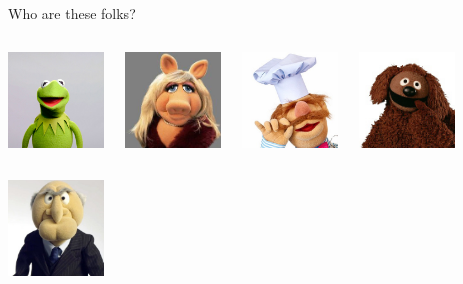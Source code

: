 \documentclass{beamer}\usepackage[]{graphicx}\usepackage[]{color}
\begin{document}
\begin{darkframes}
\begin{frame}{Who are these folks?}
  \begin{columns}[onlytextwidth]
      \begin{center}
        \includegraphics[width=1in]{kermitthefrog} \\
      \end{center}
      \begin{center}
        \includegraphics[width=1in]{misspiggy} \\
      \end{center}
      \begin{center}
        \includegraphics[width=1in]{swedishchef} \\
      \end{center}
      \begin{center}
        \includegraphics[width=1in]{rowlf} \\
      \end{center}
  \end{columns}
  \smallskip
  \begin{columns}[onlytextwidth]
      \begin{center}
        \includegraphics[width=1in]{statler} \\

\end{center}
\end{columns}
\end{frame}
\end{darkframes}
\end{document}
